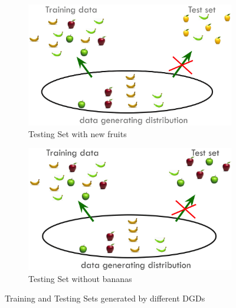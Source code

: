 \begin{figure}[h]
      \begin{subfigure}{0.45\textwidth}
            \centering
            \includegraphics[width=\textwidth]{../img/DGD_counterexample_1}
            \caption{Testing Set with new fruits}
      \end{subfigure}
      \hfill
      \begin{subfigure}{0.45\textwidth}
            \centering
            \includegraphics[width=\textwidth]{../img/DGD_counterexample_2}
            \caption{Testing Set without bananas}
      \end{subfigure}
      \caption{Training and Testing Sets generated by different DGDs}
\end{figure}